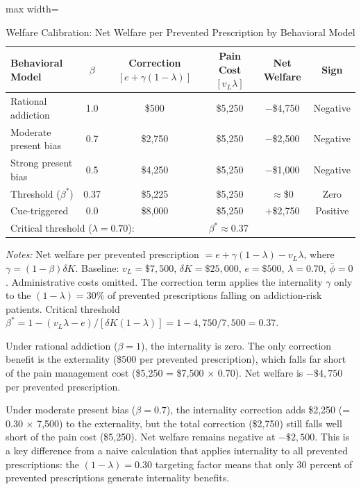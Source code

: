 \documentclass[12pt]{article}
\begin{document}
\begin{table}[htbp]
\centering
\caption{Welfare Calibration: Net Welfare per Prevented Prescription by Behavioral Model}
\label{tab:welfare}
\begin{adjustbox}{max width=\textwidth}
\begin{threeparttable}
\begin{tabular}{lccccc}
\toprule
Behavioral Model & $\beta$ & Correction $[e+\gamma(1{-}\lambda)]$ & Pain Cost $[v_L\lambda]$ & Net Welfare & Sign \\
\midrule
Rational addiction & 1.0 & \$500 & \$5,250 & $-$\$4,750 & Negative \\
Moderate present bias & 0.7 & \$2,750 & \$5,250 & $-$\$2,500 & Negative \\
Strong present bias & 0.5 & \$4,250 & \$5,250 & $-$\$1,000 & Negative \\
Threshold ($\beta^*$) & 0.37 & \$5,225 & \$5,250 & $\approx$\$0 & Zero \\
Cue-triggered & 0.0 & \$8,000 & \$5,250 & $+$\$2,750 & Positive \\
\midrule
\multicolumn{3}{l}{Critical threshold ($\lambda = 0.70$):} & \multicolumn{2}{l}{$\beta^* \approx 0.37$} \\
\bottomrule
\end{tabular}
\begin{tablenotes}
\footnotesize
\item \textit{Notes:} Net welfare per prevented prescription $= e + \gamma(1-\lambda) - v_L \lambda$, where $\gamma = (1-\beta)\delta K$. Baseline: $v_L = \$7{,}500$, $\delta K = \$25{,}000$, $e = \$500$, $\lambda = 0.70$, $\bar{\phi} = 0$. Administrative costs omitted. The correction term applies the internality $\gamma$ only to the $(1-\lambda) = 30\%$ of prevented prescriptions falling on addiction-risk patients. Critical threshold $\beta^* = 1 - (v_L\lambda - e)/[\delta K(1-\lambda)] = 1 - 4{,}750/7{,}500 = 0.37$.
\end{tablenotes}
\end{threeparttable}
\end{adjustbox}
\end{table}

Under rational addiction ($\beta = 1$), the internality is zero. The only correction benefit is the externality (\$500 per prevented prescription), which falls far short of the pain management cost (\$5,250 = \$7,500 $\times$ 0.70). Net welfare is $-\$4{,}750$ per prevented prescription.

Under moderate present bias ($\beta = 0.7$), the internality correction adds \$2,250 (= 0.30 $\times$ 7,500) to the externality, but the total correction (\$2,750) still falls well short of the pain cost (\$5,250). Net welfare remains negative at $-\$2{,}500$. This is a key difference from a naive calculation that applies internality to all prevented prescriptions: the $(1-\lambda) = 0.30$ targeting factor means that only 30 percent of prevented prescriptions generate internality benefits.
\end{document}

